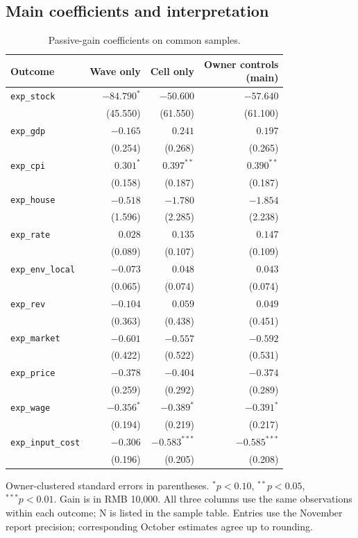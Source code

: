 \documentclass[11pt,letterpaper,english,final]{article}
\begin{document}
\subsection{Main coefficients and interpretation}
\begin{table}[H]
\centering\small
\setlength{\tabcolsep}{4pt}
\caption{Passive-gain coefficients on common samples.}
\begin{tabular}{lrrr}
\toprule
Outcome & Wave only & Cell only & \shortstack{Owner controls\\(main)} \\
\midrule
\texttt{exp\_stock} & $\bm{-84.790}^{*}$ & $-50.600$ & $-57.640$ \\
 & (45.550) & (61.550) & (61.100) \\[3pt]
\texttt{exp\_gdp} & $-0.165$ & $0.241$ & $0.197$ \\
 & (0.254) & (0.268) & (0.265) \\[3pt]
\texttt{exp\_cpi} & $\bm{0.301}^{*}$ & $\bm{0.397}^{**}$ & $\bm{0.390}^{**}$ \\
 & (0.158) & (0.187) & (0.187) \\[3pt]
\texttt{exp\_house} & $-0.518$ & $-1.780$ & $-1.854$ \\
 & (1.596) & (2.285) & (2.238) \\[3pt]
\texttt{exp\_rate} & $0.028$ & $0.135$ & $0.147$ \\
 & (0.089) & (0.107) & (0.109) \\[3pt]
\texttt{exp\_env\_local} & $-0.073$ & $0.048$ & $0.043$ \\
 & (0.065) & (0.074) & (0.074) \\[3pt]
\texttt{exp\_rev} & $-0.104$ & $0.059$ & $0.049$ \\
 & (0.363) & (0.438) & (0.451) \\[3pt]
\texttt{exp\_market} & $-0.601$ & $-0.557$ & $-0.592$ \\
 & (0.422) & (0.522) & (0.531) \\[3pt]
\texttt{exp\_price} & $-0.378$ & $-0.404$ & $-0.374$ \\
 & (0.259) & (0.292) & (0.289) \\[3pt]
\texttt{exp\_wage} & $\bm{-0.356}^{*}$ & $\bm{-0.389}^{*}$ & $\bm{-0.391}^{*}$ \\
 & (0.194) & (0.219) & (0.217) \\[3pt]
\texttt{exp\_input\_cost} & $-0.306$ & $\bm{-0.583}^{***}$ & $\bm{-0.585}^{***}$ \\
 & (0.196) & (0.205) & (0.208) \\[3pt]
\bottomrule
\end{tabular}
\par\vspace{4pt}\begin{minipage}{\linewidth}\footnotesize Owner-clustered standard errors in parentheses. $^{*}p<0.10$, $^{**}p<0.05$, $^{***}p<0.01$. Gain is in RMB 10,000. All three columns use the same observations within each outcome; N is listed in the sample table. Entries use the November report precision; corresponding October estimates agree up to rounding.\end{minipage}
\end{table}
\end{document}
